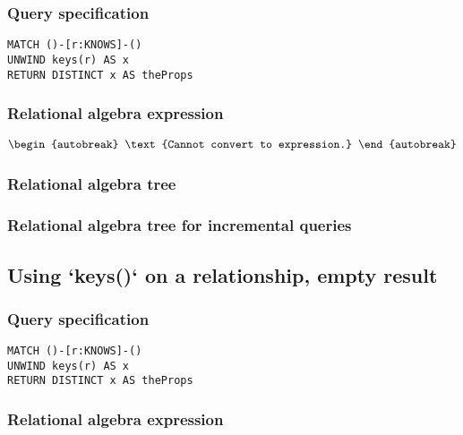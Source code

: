 \subsubsection*{Query specification}

\begin{lstlisting}
MATCH ()-[r:KNOWS]-()
UNWIND keys(r) AS x
RETURN DISTINCT x AS theProps
\end{lstlisting}

\subsubsection*{Relational algebra expression}

\begin{align*}
\begin{autobreak}
\text{Cannot convert to expression.}
\end{autobreak}
\end{align*}

\subsubsection*{Relational algebra tree}


\subsubsection*{Relational algebra tree for incremental queries}


\subsection{Using `keys()` on a relationship, empty result}

\subsubsection*{Query specification}

\begin{lstlisting}
MATCH ()-[r:KNOWS]-()
UNWIND keys(r) AS x
RETURN DISTINCT x AS theProps
\end{lstlisting}

\subsubsection*{Relational algebra expression}

